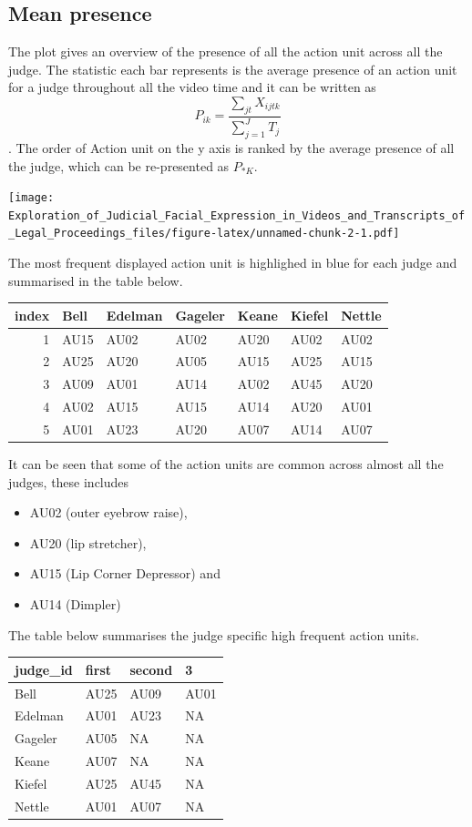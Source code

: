 \documentclass{monashthesis}
\begin{document}
\hypertarget{mean-presence}{%
\subsection{Mean presence}\label{mean-presence}}

The plot gives an overview of the presence of all the action unit across all the judge. The statistic each bar represents is the average presence of an action unit for a judge throughout all the video time and it can be written as \[P_{ik} = \frac{\sum_{jt}X_{ijtk}}{\sum_{j = 1}^JT_j}\]. The order of Action unit on the y axis is ranked by the average presence of all the judge, which can be re-presented as \(P_{* K}\).

\texttt{[image: Exploration\_of\_Judicial\_Facial\_Expression\_in\_Videos\_and\_Transcripts\_of\_Legal\_Proceedings\_files/figure-latex/unnamed-chunk-2-1.pdf]}

The most frequent displayed action unit is highlighed in blue for each judge and summarised in the table below.

\begin{tabular}{r|l|l|l|l|l|l}
\hline
index & Bell & Edelman & Gageler & Keane & Kiefel & Nettle\\
\hline
1 & AU15 & AU02 & AU02 & AU20 & AU02 & AU02\\
\hline
2 & AU25 & AU20 & AU05 & AU15 & AU25 & AU15\\
\hline
3 & AU09 & AU01 & AU14 & AU02 & AU45 & AU20\\
\hline
4 & AU02 & AU15 & AU15 & AU14 & AU20 & AU01\\
\hline
5 & AU01 & AU23 & AU20 & AU07 & AU14 & AU07\\
\hline
\end{tabular}

It can be seen that some of the action units are common across almost all the judges, these includes

\begin{itemize}
\tightlist
\item
  AU02 (outer eyebrow raise),
\item
  AU20 (lip stretcher),
\item
  AU15 (Lip Corner Depressor) and
\item
  AU14 (Dimpler)
\end{itemize}

The table below summarises the judge specific high frequent action units.

\begin{tabular}{l|l|l|l}
\hline
judge\_id & first & second & 3\\
\hline
Bell & AU25 & AU09 & AU01\\
\hline
Edelman & AU01 & AU23 & NA\\
\hline
Gageler & AU05 & NA & NA\\
\hline
Keane & AU07 & NA & NA\\
\hline
Kiefel & AU25 & AU45 & NA\\
\hline
Nettle & AU01 & AU07 & NA\\
\hline
\end{tabular}
\end{document}
